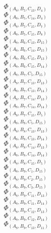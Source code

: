\documentclass[14pt]{article}
\begin{document}
    $\Phi_{({A}_{8}, {B}_{5}, {C}_{13}, {D}_{4})}$ \\ 
    $\Phi_{({A}_{8}, {B}_{5}, {C}_{14}, {D}_{4})}$ \\ 
    $\Phi_{({A}_{8}, {B}_{5}, {C}_{15}, {D}_{7})}$ \\ 
    $\Phi_{({A}_{8}, {B}_{5}, {C}_{15}, {D}_{8})}$ \\ 
    $\Phi_{({A}_{8}, {B}_{6}, {C}_{13}, {D}_{15})}$ \\ 
    $\Phi_{({A}_{8}, {B}_{6}, {C}_{14}, {D}_{15})}$ \\ 
    $\Phi_{({A}_{8}, {B}_{6}, {C}_{15}, {D}_{13})}$ \\ 
    $\Phi_{({A}_{8}, {B}_{6}, {C}_{15}, {D}_{14})}$ \\ 
    $\Phi_{({A}_{8}, {B}_{7}, {C}_{5}, {D}_{15})}$ \\ 
    $\Phi_{({A}_{8}, {B}_{7}, {C}_{13}, {D}_{13})}$ \\ 
    $\Phi_{({A}_{8}, {B}_{7}, {C}_{13}, {D}_{14})}$ \\ 
    $\Phi_{({A}_{8}, {B}_{7}, {C}_{14}, {D}_{13})}$ \\ 
    $\Phi_{({A}_{8}, {B}_{7}, {C}_{14}, {D}_{14})}$ \\ 
    $\Phi_{({A}_{8}, {B}_{7}, {C}_{15}, {D}_{5})}$ \\ 
    $\Phi_{({A}_{8}, {B}_{8}, {C}_{5}, {D}_{15})}$ \\ 
    $\Phi_{({A}_{8}, {B}_{8}, {C}_{13}, {D}_{13})}$ \\ 
    $\Phi_{({A}_{8}, {B}_{8}, {C}_{13}, {D}_{14})}$ \\ 
    $\Phi_{({A}_{8}, {B}_{8}, {C}_{14}, {D}_{13})}$ \\ 
    $\Phi_{({A}_{8}, {B}_{8}, {C}_{14}, {D}_{14})}$ \\ 
    $\Phi_{({A}_{8}, {B}_{8}, {C}_{15}, {D}_{5})}$ \\ 
    $\Phi_{({A}_{8}, {B}_{9}, {C}_{1}, {D}_{15})}$ \\ 
    $\Phi_{({A}_{8}, {B}_{9}, {C}_{2}, {D}_{15})}$ \\ 
    $\Phi_{({A}_{8}, {B}_{9}, {C}_{3}, {D}_{15})}$ \\ 
    $\Phi_{({A}_{8}, {B}_{9}, {C}_{11}, {D}_{13})}$ \\ 
    $\Phi_{({A}_{8}, {B}_{9}, {C}_{11}, {D}_{14})}$ \\ 
    $\Phi_{({A}_{8}, {B}_{9}, {C}_{12}, {D}_{13})}$ \\ 
    $\Phi_{({A}_{8}, {B}_{9}, {C}_{12}, {D}_{14})}$ \\ 
    $\Phi_{({A}_{8}, {B}_{9}, {C}_{13}, {D}_{11})}$ \\ 
\end{document}
